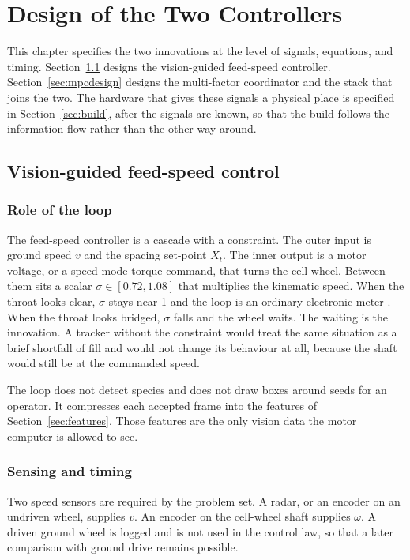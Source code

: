 \chapter{Design of the Two Controllers}
\label{ch:design}

This chapter specifies the two innovations at the level of signals, equations, and timing. Section~\ref{sec:visiondesign} designs the vision-guided feed-speed controller. Section~\ref{sec:mpcdesign} designs the multi-factor coordinator and the stack that joins the two. The hardware that gives these signals a physical place is specified in Section~\ref{sec:build}, after the signals are known, so that the build follows the information flow rather than the other way around.

\section{Vision-guided feed-speed control}
\label{sec:visiondesign}

\subsection{Role of the loop}

The feed-speed controller is a cascade with a constraint. The outer input is ground speed $v$ and the spacing set-point $X_t$. The inner output is a motor voltage, or a speed-mode torque command, that turns the cell wheel. Between them sits a scalar $\sigma\in[0.72,1.08]$ that multiplies the kinematic speed. When the throat looks clear, $\sigma$ stays near 1 and the loop is an ordinary electronic meter \cite{he2017,zhao2024}. When the throat looks bridged, $\sigma$ falls and the wheel waits. The waiting is the innovation. A tracker without the constraint would treat the same situation as a brief shortfall of fill and would not change its behaviour at all, because the shaft would still be at the commanded speed.

The loop does not detect species and does not draw boxes around seeds for an operator. It compresses each accepted frame into the features of Section~\ref{sec:features}. Those features are the only vision data the motor computer is allowed to see.

\subsection{Sensing and timing}

Two speed sensors are required by the problem set. A radar, or an encoder on an undriven wheel, supplies $v$. An encoder on the cell-wheel shaft supplies $\omega$. A driven ground wheel is logged and is not used in the control law, so that a later comparison with ground drive remains possible.

